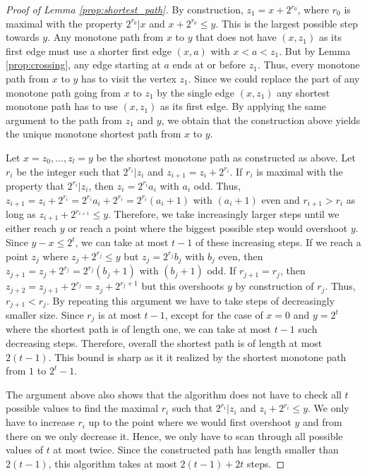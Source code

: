 \documentclass[a4paper,UKenglish,cleveref,nolineno,autoref]{socg-lipics-v2021}
\begin{document}
\begin{proof}[Proof of Lemma \ref{prop:shortest_path}]
By construction, $z_1=x+2^{r_0}$, where $r_0$ is maximal with the property $2^{r_0}\vert x$ and $x+2^{r_0}\leq y$. This is the largest possible step towards $y$. Any monotone path from $x$ to $y$ that does not have $(x,z_1)$ as its first edge must use a shorter first edge $(x,a)$ with $x<a<z_1$. But by Lemma \ref{prop:crossing}, any edge starting at $a$ ends at or before $z_1$. Thus, every monotone path from $x$ to $y$ has to visit the vertex $z_1$. Since we could replace the part of any monotone path going from $x$ to $z_1$ by the single edge $(x,z_1)$ any shortest monotone path has to use $(x,z_1)$ as its first edge. By applying the same argument to the path from $z_1$ and $y$, we obtain that the construction above yields the unique monotone shortest path from $x$ to $y$.   

Let $x=z_0,\ldots,z_l=y$ be the shortest monotone path as constructed as above. Let $r_i$ be the integer such that $2^{r_i}\vert z_i$ and $z_{i+1}=z_i+2^{r_i}$. If $r_i$ is maximal with the property that $2^{r_i}\vert z_i$, then $z_i=2^{r_i}a_i$ with $a_i$ odd. Thus, $z_{i+1}=z_i+2^{r_i}=2^{r_i}a_i+2^{r_i}=2^{r_i}(a_i+1)$ with $(a_i+1)$ even and $r_{i+1}>r_i$ as long as $z_{i+1}+2^{r_{i+1}}\leq y$. Therefore, we take increasingly larger steps until we either reach $y$ or reach a point where the biggest possible step would overshoot $y$. Since $y-x\leq 2^t$, we can take at most $t-1$ of these increasing steps. If we reach a point $z_j$ where $z_j+2^{r_{j}}\leq y$ but $z_j=2^{r_j}b_j$ with $b_j$ even, then $z_{j+1}=z_j+2^{r_j}=2^{r_j}(b_j+1)$ with $(b_j+1)$ odd. If $r_{j+1}=r_j$, then $z_{j+2}=z_{j+1}+2^{r_j}=z_j+2^{r_j+1}$ but this overshoots $y$ by construction of $r_j$. Thus, $r_{j+1}<r_{j}$. By repeating this argument we have to take steps of decreasingly smaller size. Since $r_j$ is at most $t-1$, except for the case of $x=0$ and $y=2^t$ where the shortest path is of length one, we can take at most $t-1$ such decreasing steps. Therefore, overall the shortest path is of length at most $2(t-1)$. This bound is sharp as it it realized by the shortest monotone path from $1$ to $2^{t}-1$. 

The argument above also shows that the algorithm does not have to check all $t$ possible values to find the maximal $r_i$ such that $2^{r_i}\vert z_i$ and $z_i+2^{r_i}\leq y$. We only have to increase $r_i$ up to the point where we would first overshoot $y$ and from there on we only decrease it. Hence, we only have to scan through all possible values of $t$ at most twice. Since the constructed path has length smaller than $2(t-1)$, this algorithm takes at most $2(t-1)+2t$ steps.   
\end{proof}
\end{document}
